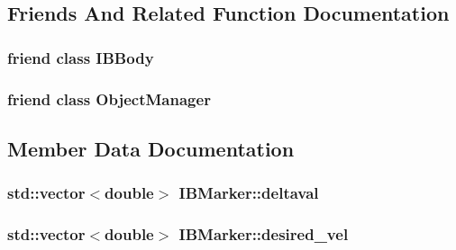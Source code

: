 \subsection{Friends And Related Function Documentation}
\subsubsection[{\texorpdfstring{I\+B\+Body}{IBBody}}]{\setlength{\rightskip}{0pt plus 5cm}friend class {\bf I\+B\+Body}\hspace{0.3cm}{\ttfamily [friend]}}\hypertarget{class_i_b_marker_a5d93aa5aec680a2b395a71266fe4ac92}{}\label{class_i_b_marker_a5d93aa5aec680a2b395a71266fe4ac92}
\subsubsection[{\texorpdfstring{Object\+Manager}{ObjectManager}}]{\setlength{\rightskip}{0pt plus 5cm}friend class {\bf Object\+Manager}\hspace{0.3cm}{\ttfamily [friend]}}\hypertarget{class_i_b_marker_a8b86bdcdb7c54a536293d8632363e114}{}\label{class_i_b_marker_a8b86bdcdb7c54a536293d8632363e114}


\subsection{Member Data Documentation}
\subsubsection[{\texorpdfstring{deltaval}{deltaval}}]{\setlength{\rightskip}{0pt plus 5cm}std\+::vector$<$double$>$ I\+B\+Marker\+::deltaval\hspace{0.3cm}{\ttfamily [protected]}}\hypertarget{class_i_b_marker_a82296e15048c55bd121245d85b076168}{}\label{class_i_b_marker_a82296e15048c55bd121245d85b076168}
\subsubsection[{\texorpdfstring{desired\+\_\+vel}{desired_vel}}]{\setlength{\rightskip}{0pt plus 5cm}std\+::vector$<$double$>$ I\+B\+Marker\+::desired\+\_\+vel\hspace{0.3cm}{\ttfamily [protected]}}\hypertarget{class_i_b_marker_ad9535b494684533ace9a9523c4df26bf}{}\label{class_i_b_marker_ad9535b494684533ace9a9523c4df26bf}
